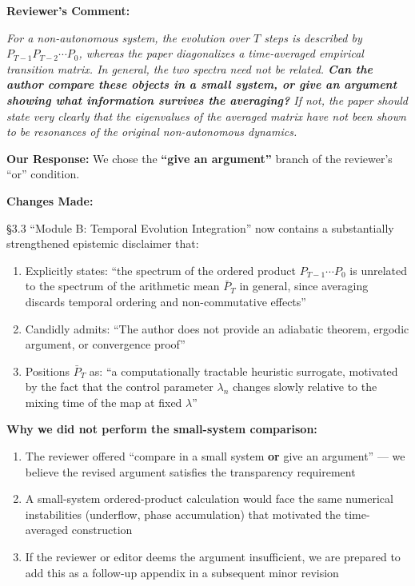 \documentclass[11pt]{article}
\begin{document}
\noindent\textbf{Reviewer's Comment:}
\begin{quotebox}
\itshape For a non-autonomous system, the evolution over $T$ steps is described by $P_{T-1}P_{T-2}\cdots P_0$, whereas the paper diagonalizes a time-averaged empirical transition matrix. In general, the two spectra need not be related. \textbf{Can the author compare these objects in a small system, or give an argument showing what information survives the averaging?} If not, the paper should state very clearly that the eigenvalues of the averaged matrix have not been shown to be resonances of the original non-autonomous dynamics.
\end{quotebox}

\noindent\textbf{Our Response:} We chose the \textbf{``give an argument''} branch of the reviewer's ``or'' condition.

\noindent\textbf{Changes Made:}

\S3.3 ``Module B: Temporal Evolution Integration'' now contains a substantially strengthened epistemic disclaimer that:
\begin{enumerate}
\item Explicitly states: ``the spectrum of the ordered product $P_{T-1}\cdots P_0$ is unrelated to the spectrum of the arithmetic mean $\bar{P}_T$ in general, since averaging discards temporal ordering and non-commutative effects''
\item Candidly admits: ``The author does not provide an adiabatic theorem, ergodic argument, or convergence proof''
\item Positions $\bar{P}_T$ as: ``a computationally tractable heuristic surrogate, motivated by the fact that the control parameter $\lambda_n$ changes slowly relative to the mixing time of the map at fixed $\lambda$''
\end{enumerate}

\noindent\textbf{Why we did not perform the small-system comparison:}
\begin{enumerate}
\item The reviewer offered ``compare in a small system \textbf{or} give an argument'' --- we believe the revised argument satisfies the transparency requirement
\item A small-system ordered-product calculation would face the same numerical instabilities (underflow, phase accumulation) that motivated the time-averaged construction
\item If the reviewer or editor deems the argument insufficient, we are prepared to add this as a follow-up appendix in a subsequent minor revision
\end{enumerate}
\end{document}
